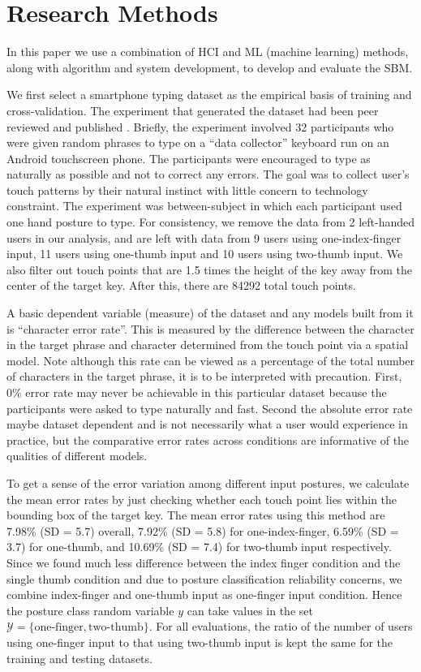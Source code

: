 \documentclass{sigchi}
\begin{document}
\section{Research Methods}
In this paper we use a combination of HCI and ML (machine learning) methods, 
along with algorithm and system development, to develop and evaluate the SBM.

We first select a smartphone typing dataset as the empirical basis of training 
and cross-validation. The experiment that generated the dataset had been peer 
reviewed and published \cite{Azenkot:2012}. Briefly, the experiment involved 32
participants who were given random phrases to type on a ``data collector''
keyboard run on an Android touchscreen phone.  The participants were encouraged 
to type as naturally as possible and not to correct any errors. The goal was to 
collect user’s touch patterns by their natural instinct with little concern to 
technology constraint. The experiment was between-subject in which each 
participant used one hand posture to type. For consistency, we remove the data 
from 2 left-handed users in our analysis, and are left with data from 9 users 
using one-index-finger input, 11 users using one-thumb input and 10 users using 
two-thumb input.  We also 
filter out touch points that are 1.5 times the height of the key away from 
the center of the target key. After this, there are 84292 total touch points.
 
A basic dependent variable (measure) of the dataset and any models built from it
is ``character error rate''. This is measured by the difference between the
character in the target phrase and character determined from the touch point via
a spatial model. Note although this rate can be viewed as a percentage of the 
total number of characters in the target phrase, it is to be interpreted with 
precaution. First, 0\% error rate may never be achievable in this
particular dataset because the participants were asked to type naturally and
fast. Second the absolute error rate maybe dataset dependent and is not
necessarily what a user would experience in practice, but the comparative error rates across conditions are informative of the qualities 
of different models.

To get a sense of the error variation among different input postures, we
calculate the mean error rates by just checking whether each touch point lies within the
bounding box of the target key. The mean error rates using this method are
7.98\% (SD = 5.7) overall, 7.92\% (SD = 5.8) for one-index-finger, 6.59\% (SD =
3.7) for one-thumb, and 10.69\% (SD = 7.4) for two-thumb input respectively.
Since we found much less difference between the index finger condition and the single thumb condition and due to posture classification reliability concerns, we combine index-finger and one-thumb input as one-finger input condition. Hence the posture class random variable $y$ can take values in the set $\mathcal{Y} = \{\text{one-finger}, \text{two-thumb}\}$.
For all evaluations, the ratio of the number of users using one-finger input to 
that using two-thumb input is kept the same for the training and testing datasets.
\end{document}
